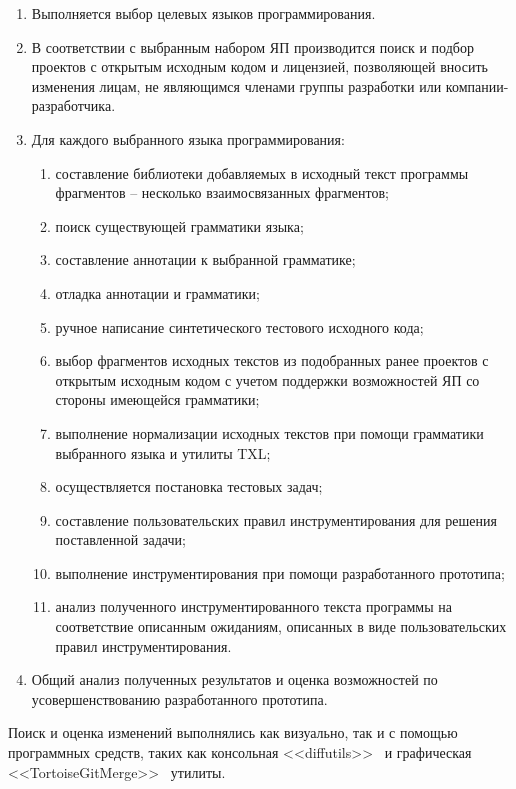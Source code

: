 \begin{enumerate}[label=\arabic*]
  \item Выполняется выбор целевых языков программирования.
  \item В соответствии с выбранным набором ЯП производится поиск и подбор проектов с открытым исходным кодом и лицензией, позволяющей вносить изменения лицам, не являющимся членами группы разработки или компании-разработчика.
  \item Для каждого выбранного языка программирования:
    \begin{enumerate}[label*=.\arabic*]
      \item составление библиотеки добавляемых в исходный текст программы фрагментов -- несколько взаимосвязанных фрагментов;

      \item поиск существующей грамматики языка;
      \item составление аннотации к выбранной грамматике;
      \item отладка аннотации и грамматики;

      \item ручное написание синтетического тестового исходного кода;
      \item выбор фрагментов исходных текстов из подобранных ранее проектов с открытым исходным кодом с учетом поддержки возможностей ЯП со стороны имеющейся грамматики;
      \item выполнение нормализации исходных текстов при помощи грамматики выбранного языка и утилиты TXL;

      \item осуществляется постановка тестовых задач;
      \item составление пользовательских правил инструментирования для решения поставленной задачи;

      \item выполнение инструментирования при помощи разработанного прототипа;
      \item анализ полученного инструментированного текста программы на соответствие описанным ожиданиям, описанных в виде пользовательских правил инструментирования.
    \end{enumerate}

  \item Общий анализ полученных результатов и оценка возможностей по усовершенствованию разработанного прототипа.
\end{enumerate}

Поиск и оценка изменений выполнялись как визуально, так и с помощью программных средств, таких как консольная <<diffutils>>~\cite{diffutils} и графическая <<TortoiseGitMerge>>~\cite{tortoise-git} утилиты.

